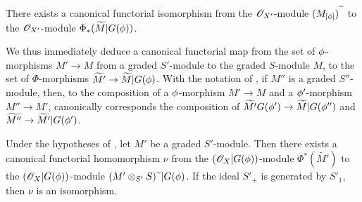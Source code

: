 \begin{proposition}[2.8.7]
\label{II.2.8.7}
There exists a canonical functorial isomorphism from the $\mathscr{O}_{X'}$-module $(M_{[\phi]})^{\,\widetilde{\,}\,}$ to the $\mathscr{O}_{X'}$-module $\Phi_*(\widetilde{M}|G(\phi))$.
\end{proposition}

We thus immediately deduce a canonical functorial map from the set of $\phi$-morphisms $M'\to M$ from a graded $S'$-module to the graded $S$-module $M$, to the set of $\Phi$-morphisms $\widetilde{M'}\to\widetilde{M}|G(\vphi)$.
With the notation of , if $M''$ is a graded $S''$-module, then, to the composition of a $\phi$-morphism $M'\to M$ and a $\phi'$-morphism $M''\to M'$, canonically corresponds the composition of $\widetilde{M'}G(\vphi')\to\widetilde{M}|G(\vphi'')$ and $\widetilde{M''}\to\widetilde{M'}|G(\vphi')$.

\begin{proposition}[2.8.8]
\label{II.2.8.8}
Under the hypotheses of , let $M'$ be a graded $S'$-module.
Then there exists a canonical functorial homomorphism $\nu$ from the $(\mathscr{O}_X|G(\phi))$-module $\Phi^*(\widetilde{M'})$ to the $(\mathscr{O}_X|G(\phi))$-module $(M'\otimes_{S'}S){\,\widetilde{\,}\,}|G(\phi)$.
If the ideal $S'_+$ is generated by $S'_1$, then $\nu$ is an isomorphism.
\end{proposition}

